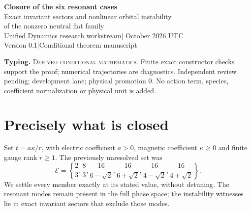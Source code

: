 \documentclass[11pt,a4paper]{article}
\begin{document}
\begin{center}
{\Large\bfseries Closure of the six resonant cases}\\[8pt]
{\large Exact invariant sectors and nonlinear orbital instability\\of the nonzero neutral flat family}\\[10pt]
Unified Dynamics research workstream\quad | October 2026 UTC\\
Version 0.1\quad |\quad Conditional theorem manuscript
\end{center}
\begin{abstract}
The preceding nonlinear instability manuscript left six positive parameter values unresolved because a field oscillator resonated with the matter source. We construct two exactly invariant nonlinear symmetry sectors. The vertex stabilizer $S_3$ retains only gradient field stiffnesses $6\pm\sqrt2$; a cyclic $C_4$ sector retains only $6,4\pm\sqrt2$. At each formerly excluded parameter, one sector has no resonant retained field frequency and has a nonzero Coulomb-corrected averaged matter drift. Fixed-norm, exactly Gauss-admissible initial states then undergo fixed orbital departure under the full nonlinear flow. Combined with the preceding cases, this proves instability of the specified nonzero flat family for every positive electric coefficient and every nonnegative magnetic coefficient at finite rank. This conclusion is conditional on the unchanged candidate action. It does not identify a physical interaction or classify other backgrounds.
\end{abstract}
\textbf{Typing.} \textsc{Derived conditional mathematics}. Finite exact constructor checks support the proof; numerical trajectories are diagnostics. Independent review pending; development lane; physical promotion $0$. No action term, species, coefficient normalization or physical unit is added.

\section{Precisely what is closed}
Set $t=a\kappa/r$, with electric coefficient $a>0$, magnetic coefficient $\kappa\geq0$ and finite gauge rank $r\geq1$. The previously unresolved set was
\[
\mathcal E=\left\{\frac23,\frac83,\frac{16}{6-\sqrt2},\frac{16}{6+\sqrt2},
\frac{16}{4-\sqrt2},\frac{16}{4+\sqrt2}\right\}.
\]
We settle every member exactly at its stated value, without detuning. The resonant modes remain present in the full phase space; the instability witnesses lie in exact invariant sectors that exclude those modes.
\end{document}
